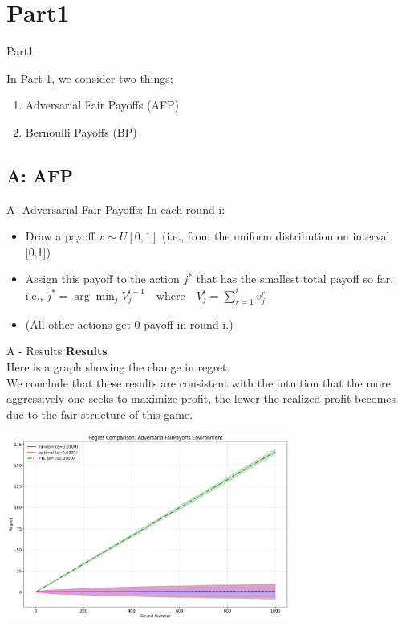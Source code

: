 \documentclass{beamer}
\begin{document}
\section{Part1}
\begin{frame}{Part1}

In Part 1, we consider two things;
\begin{enumerate}
    \item Adversarial Fair Payoffs (AFP) 
    \item Bernoulli Payoffs (BP)
\end{enumerate}
\end{frame}

\subsection{A: AFP}
\begin{frame}{A- Adversarial Fair Payoffs:}
       In each round i:
    \begin{itemize}
        \item Draw a payoff $x \sim U[0,1]$ (i.e., from the uniform distribution on interval [0,1])
        \item Assign this payoff to the action $j^*$ that has the smallest total payoff so far,\\
        i.e., $j^* = \arg\min_j V^{i-1}_{j} \quad \text{where} \quad V^{i}_{j} = \sum_{r=1}^{i} v^{r}_{j}$
        \item (All other actions get 0 payoff in round i.)
    \end{itemize} 
\end{frame}

\begin{frame}{A - Results}
\textbf{Results}\\
Here is a graph showing the change in regret. \\
We conclude that these results are consistent with the intuition that the more aggressively one seeks to maximize profit, the lower the realized profit becomes due to the fair structure of this game.
\begin{center}
    \includegraphics[width=0.7\textwidth]{332Project2/figures/adversarial_regret_comparison.png}
\end{center}

\end{frame}
\end{document}

